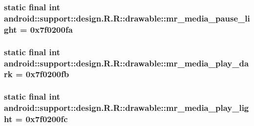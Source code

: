 \hypertarget{classandroid_1_1support_1_1design_1_1_r_1_1drawable_687e99e33c983e22fede0ace3b6c7f31}{
\subsubsection[{mr\_\-media\_\-pause\_\-light}]{\setlength{\rightskip}{0pt plus 5cm}static final int android::support::design.R.R::drawable::mr\_\-media\_\-pause\_\-light = 0x7f0200fa}}
\label{classandroid_1_1support_1_1design_1_1_r_1_1drawable_687e99e33c983e22fede0ace3b6c7f31}


\hypertarget{classandroid_1_1support_1_1design_1_1_r_1_1drawable_54df627fa129107c9c2d8d76bf71026c}{
\subsubsection[{mr\_\-media\_\-play\_\-dark}]{\setlength{\rightskip}{0pt plus 5cm}static final int android::support::design.R.R::drawable::mr\_\-media\_\-play\_\-dark = 0x7f0200fb}}
\label{classandroid_1_1support_1_1design_1_1_r_1_1drawable_54df627fa129107c9c2d8d76bf71026c}


\hypertarget{classandroid_1_1support_1_1design_1_1_r_1_1drawable_903a73ddbdd42c1dc67a181aa8e33a45}{
\subsubsection[{mr\_\-media\_\-play\_\-light}]{\setlength{\rightskip}{0pt plus 5cm}static final int android::support::design.R.R::drawable::mr\_\-media\_\-play\_\-light = 0x7f0200fc}}
\label{classandroid_1_1support_1_1design_1_1_r_1_1drawable_903a73ddbdd42c1dc67a181aa8e33a45}


